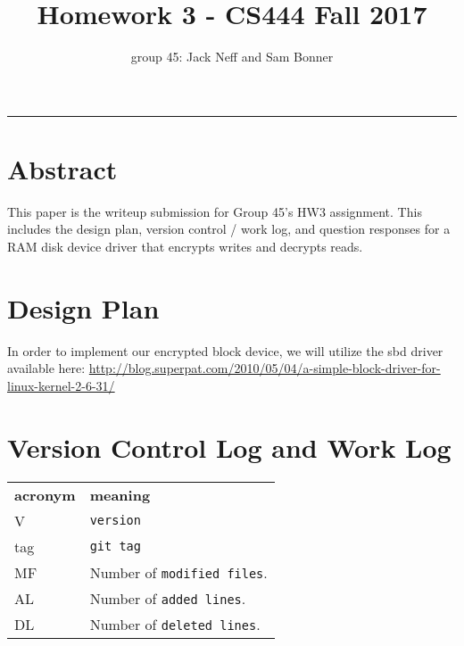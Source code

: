 \documentclass[letterpaper,10pt,fleqn]{article}
\title{Homework 3 - CS444 Fall 2017}
\author{group 45: Jack Neff and Sam Bonner}
\begin{document}
\maketitle
\hrule

\section*{Abstract}

This paper is the writeup submission for Group 45's HW3 assignment. This includes the design plan, version control / work log, and question responses for a RAM disk device driver that encrypts writes and decrypts reads.

\pagebreak
\section*{Design Plan}

In order to implement our encrypted block device, we will utilize the sbd driver available here: \url{http://blog.superpat.com/2010/05/04/a-simple-block-driver-for-linux-kernel-2-6-31/}

\section*{Version Control Log and Work Log}
 
 \begin{tabular}{lp{8cm}}
  \label{tabular:legend:git-log}
  \textbf{acronym} & \textbf{meaning} \\
  V & \texttt{version} \\
  tag & \texttt{git tag} \\
  MF & Number of \texttt{modified files}. \\
  AL & Number of \texttt{added lines}. \\
  DL & Number of \texttt{deleted lines}. \\
\end{tabular}

\bigskip
\end{document}
